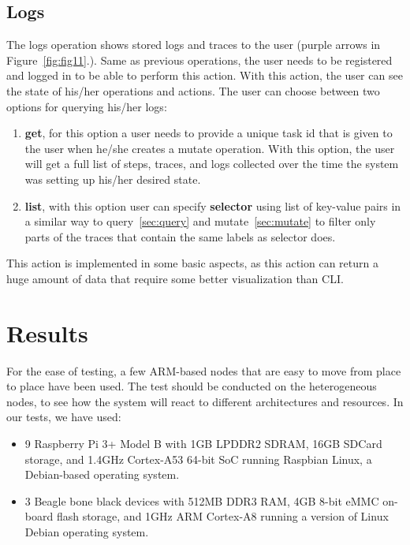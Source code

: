 \subsection{Logs}\label{sec:logs}
% 
The logs operation shows stored logs and traces to the user (purple arrows in Figure~\ref{fig:fig11}.). Same as previous operations, the user needs to be registered and logged in to be able to perform this action. With this action, the user can see the state of his/her operations and actions. The user can choose between two options for querying his/her logs:

\begin{enumerate}[start=1,label={(\bfseries \arabic*)}]
	\item \textbf{get}, for this option a user needs to provide a unique task id that is given to the user when he/she creates a mutate operation. With this option, the user will get a full list of steps, traces, and logs collected over the time the system was setting up his/her desired state.  
	\item \textbf{list}, with this option user can specify \textbf{selector} using list of key-value pairs in a similar way to query~\ref{sec:query} and mutate~\ref{sec:mutate} to filter only parts of the traces that contain the same labels as selector does.
\end{enumerate}

\noindent
This action is implemented in some basic aspects, as this action can return a huge amount of data that require some better visualization than CLI.
%
%
\section{Results}\label{sec:results}
% 
For the ease of testing, a few ARM-based nodes that are easy to move from place to place have been used. The test should be conducted on the heterogeneous nodes, to see how the system will react to different architectures and resources. In our tests, we have used:

\begin{itemize}
	\item 9 Raspberry Pi 3+ Model B with 1GB LPDDR2 SDRAM, 16GB SDCard storage, and 1.4GHz Cortex-A53 64-bit SoC running Raspbian Linux, a Debian-based operating system.
	\item 3 Beagle bone black devices with 512MB DDR3 RAM, 4GB 8-bit eMMC on-board flash storage, and 1GHz ARM Cortex-A8 running a version of Linux Debian operating system.
\end{itemize}

